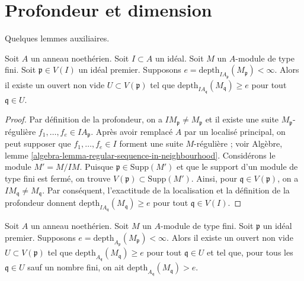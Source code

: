 \section{Profondeur et dimension}
\label{section-dept-dimension}

\noindent
Quelques lemmes auxiliaires.

\begin{lemma}
\label{lemma-ideal-depth-function}
Soit $A$ un anneau noethérien. Soit $I \subset A$ un idéal. Soit $M$ un $A$-module de type fini. Soit $\mathfrak p \in V(I)$ un idéal premier. Supposons $e = \text{depth}_{IA_\mathfrak p}(M_\mathfrak p) < \infty$. Alors il existe un ouvert non vide $U \subset V(\mathfrak p)$ tel que $\text{depth}_{IA_\mathfrak q}(M_\mathfrak q) \geq e$ pour tout $\mathfrak q \in U$.
\end{lemma}

\begin{proof}
Par définition de la profondeur, on a $IM_\mathfrak p \not = M_\mathfrak p$ et il existe une suite $M_\mathfrak p$-régulière $f_1, \ldots, f_e \in IA_\mathfrak p$. Après avoir remplacé $A$ par un localisé principal, on peut supposer que $f_1, \ldots, f_e \in I$ forment une suite $M$-régulière ; voir Algèbre, lemme \ref{algebra-lemma-regular-sequence-in-neighbourhood}. Considérons le module $M' = M/IM$. Puisque $\mathfrak p \in \text{Supp}(M')$ et que le support d'un module de type fini est fermé, on trouve $V(\mathfrak p) \subset \text{Supp}(M')$. Ainsi, pour $\mathfrak q \in V(\mathfrak p)$, on a $IM_\mathfrak q \not = M_\mathfrak q$. Par conséquent, l'exactitude de la localisation et la définition de la profondeur donnent $\text{depth}_{IA_\mathfrak q}(M_\mathfrak q) \geq e$ pour tout $\mathfrak q \in V(I)$.
\end{proof}

\begin{lemma}
\label{lemma-depth-function}
Soit $A$ un anneau noethérien. Soit $M$ un $A$-module de type fini. Soit $\mathfrak p$ un idéal premier. Supposons $e = \text{depth}_{A_\mathfrak p}(M_\mathfrak p) < \infty$. Alors il existe un ouvert non vide $U \subset V(\mathfrak p)$ tel que $\text{depth}_{A_\mathfrak q}(M_\mathfrak q) \geq e$ pour tout $\mathfrak q \in U$ et tel que, pour tous les $\mathfrak q \in U$ sauf un nombre fini, on ait $\text{depth}_{A_\mathfrak q}(M_\mathfrak q) > e$.
\end{lemma}

